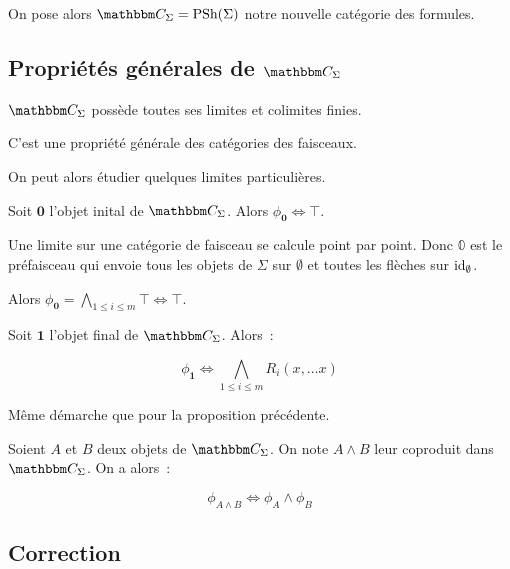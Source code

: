 On pose alors $\C_\Sigma = \psh(\Sigma)$ notre nouvelle catégorie des formules.

\subsection{Propriétés générales de $\C_\Sigma$}

\begin{lem}
    $\C_\Sigma$ possède toutes ses limites et colimites finies.
\end{lem}

\begin{pv}
    C'est une propriété générale des catégories des faisceaux.
\end{pv}

On peut alors étudier quelques limites particulières.

\begin{lem}
    Soit $\mathbf{0}$ l'objet inital de $\C_\Sigma$. Alors $\phi_\mathbf{0}\iff\top$.
\end{lem}

\begin{pv}
    Une limite sur une catégorie de faisceau se calcule point par point. Donc $\mathbb{0}$
    est le préfaisceau qui envoie tous les objets de $\Sigma$ sur $\emptyset$ et toutes
    les flèches sur $\operatorname{id}_\emptyset$.

    Alors $\phi_\mathbf{0} = \bigwedge_{1\leq i\leq m}\top \iff \top$.
\end{pv}

\begin{lem}
    Soit $\mathbf{1}$ l'objet final de $\C_\Sigma$. Alors~:

    \[\phi_\mathbf{1} \iff \bigwedge_{1\leq i\leq m}R_i(x,\dots x)\]
\end{lem}

\begin{pv}
    Même démarche que pour la proposition précédente.
\end{pv}

\begin{lem}
    Soient $A$ et $B$ deux objets de $\C_\Sigma$. On note $A\wedge B$ leur coproduit
    dans $\C_\Sigma$. On a alors~:

    \[\phi_{A\wedge B} \iff \phi_A\wedge\phi_B \]
\end{lem}

\subsection{Correction}


